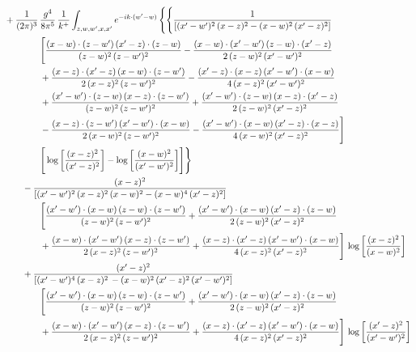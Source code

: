 \documentclass[10pt]{article}
\numberwithin{equation}{section}
\begin{document}
\begin{align}
&+\frac{1}{(2\pi)^{3}}\,\frac{g^{4}}{8\pi^{5}}\,\frac{1}{k^{+}}\int_{z,w,w^{\prime},x,x^{\prime}}e^{-ik\cdot(w^{\prime}-w)}\,\Bigg\{\Bigg\{ \frac{1}{\left[(x^{\prime}-w^{\prime})^{2}\, (x-z)^{2}-(x-w)^{2}\, (x^{\prime}-z)^{2}\right]}\,\notag\\&\qquad\qquad  \Bigg[\frac{(x-w)\cdot (z-w^{\prime})\, (x^{\prime}-z)\cdot (z-w)}{(z-w)^{2}\,(z-w^{\prime})^{2}}-\frac{(x-w)\cdot (x^{\prime}-w^{\prime})\, (z-w)\cdot (x^{\prime}-z)}{2\, (z-w)^{2}\, (x^{\prime}-w^{\prime})^{2}}\notag\\&\qquad\qquad  + \frac{(x-z)\cdot (x^{\prime}-z)\, (x-w)\cdot (z-w^{\prime})}{2\, (x-z)^{2}\, (z-w^{\prime})^{2}}-\frac{(x^{\prime}-z)\cdot (x-z)\, (x^{\prime}-w^{\prime})\cdot (x-w)}{4\, (x-z)^{2}\, (x^{\prime}-w^{\prime})^{2}}\notag\\&\qquad\qquad  + \frac{(x^{\prime}-w^{\prime})\cdot (z-w)\, (x-z)\cdot (z-w^{\prime})}{(z-w)^{2}\,(z-w^{\prime})^{2}}+\frac{(x^{\prime}-w^{\prime})\cdot (z-w)\, (x-z)\cdot (x^{\prime}-z)}{2\, (z-w)^{2}\, (x^{\prime}-z)^{2}}\notag\\&\qquad\qquad  - \frac{(x-z)\cdot (z-w^{\prime})\, (x^{\prime}-w^{\prime})\cdot (x-w)}{2\, (x-w)^{2}\, (z-w^{\prime})^{2}} -\frac{(x^{\prime}-w^{\prime})\cdot (x-w)\, (x^{\prime}-z)\cdot (x-z)}{4\, (x-w)^{2}\, (x^{\prime}-z)^{2}}\Bigg]\notag\\&\qquad\qquad   \Bigg[\log{\left[\frac{(x-z)^{2}}{ (x^{\prime}-z)^{2}}\right]}-\log{\left[\frac{(x-w)^{2}}{(x^{\prime}-w^{\prime})^{2}}\right]}\Bigg]\Bigg\}\notag\\
&\qquad-\frac{(x-z)^{2}}{\left[(x^{\prime}-w^{\prime})^{2}\,(x-z)^{2}\,(x-w)^{2} - (x-w)^{4}\, (x^{\prime}-z)^{2}\right]}\,  \notag\\&\qquad\qquad  \Bigg[\frac{(x^{\prime}-w^{\prime})\cdot (x-w)\, (z-w)\cdot (z-w^{\prime})}{(z-w)^{2}\, (z-w^{\prime})^{2}}+\frac{(x^{\prime}-w^{\prime})\cdot (x-w)\, (x^{\prime}-z)\cdot (z-w)}{2\, (z-w)^{2}\, (x^{\prime}-z)^{2}}\notag\\&\qquad\qquad  +\frac{(x-w)\cdot (x^{\prime}-w^{\prime})\, (x-z)\cdot (z-w^{\prime})}{2\, (x-z)^{2}\, (z-w^{\prime})^{2}}+\frac{(x-z)\cdot (x^{\prime}-z)\, (x^{\prime}-w^{\prime})\cdot (x-w)}{4\, (x-z)^{2}\, (x^{\prime}-z)^{2}}\Bigg] \,\log{\left[\frac{(x-z)^{2}}{(x-w)^{2}}\right]}\notag\\
&\qquad+\frac{(x^{\prime}-z)^{2}}{\left[(x^{\prime}-w^{\prime})^{4}\,(x-z)^{2}\, - (x-w)^{2}\, (x^{\prime}-z)^{2}\,(x^{\prime}-w^{\prime})^{2}\right]}\,  \notag\\&\qquad\qquad  \Bigg[\frac{(x^{\prime}-w^{\prime})\cdot (x-w)\, (z-w)\cdot (z-w^{\prime})}{(z-w)^{2}\, (z-w^{\prime})^{2}}+\frac{(x^{\prime}-w^{\prime})\cdot (x-w)\, (x^{\prime}-z)\cdot (z-w)}{2\, (z-w)^{2}\, (x^{\prime}-z)^{2}}\notag\\&\qquad\qquad  +\frac{(x-w)\cdot (x^{\prime}-w^{\prime})\, (x-z)\cdot (z-w^{\prime})}{2\, (x-z)^{2}\, (z-w^{\prime})^{2}}+\frac{(x-z)\cdot (x^{\prime}-z)\, (x^{\prime}-w^{\prime})\cdot (x-w)}{4\, (x-z)^{2}\, (x^{\prime}-z)^{2}}\Bigg] \,\log{\left[\frac{(x^{\prime}-z)^{2}}{(x^{\prime}-w^{\prime})^{2}}\right]}\notag\\

\end{align}
\end{document}
